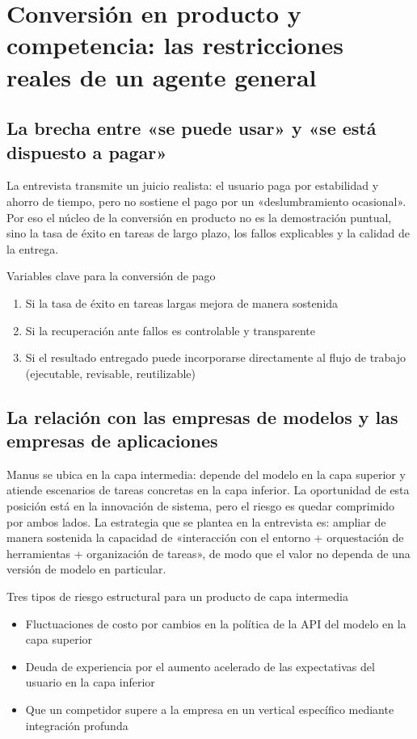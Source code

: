 \section{Conversión en producto y competencia: las restricciones reales de un agente general}

\subsection{La brecha entre «se puede usar» y «se está dispuesto a pagar»}

La entrevista transmite un juicio realista: el usuario paga por estabilidad y ahorro de tiempo, pero no sostiene el pago por un «deslumbramiento ocasional». Por eso el núcleo de la conversión en producto no es la demostración puntual, sino la tasa de éxito en tareas de largo plazo, los fallos explicables y la calidad de la entrega.

\begin{importantbox}{Variables clave para la conversión de pago}
\begin{enumerate}
    \item Si la tasa de éxito en tareas largas mejora de manera sostenida
    \item Si la recuperación ante fallos es controlable y transparente
    \item Si el resultado entregado puede incorporarse directamente al flujo de trabajo (ejecutable, revisable, reutilizable)
\end{enumerate}
\end{importantbox}

\subsection{La relación con las empresas de modelos y las empresas de aplicaciones}

Manus se ubica en la capa intermedia: depende del modelo en la capa superior y atiende escenarios de tareas concretas en la capa inferior. La oportunidad de esta posición está en la innovación de sistema, pero el riesgo es quedar comprimido por ambos lados. La estrategia que se plantea en la entrevista es: ampliar de manera sostenida la capacidad de «interacción con el entorno + orquestación de herramientas + organización de tareas», de modo que el valor no dependa de una versión de modelo en particular.

\begin{warningbox}{Tres tipos de riesgo estructural para un producto de capa intermedia}
\begin{itemize}
    \item Fluctuaciones de costo por cambios en la política de la API del modelo en la capa superior
    \item Deuda de experiencia por el aumento acelerado de las expectativas del usuario en la capa inferior
    \item Que un competidor supere a la empresa en un vertical específico mediante integración profunda
\end{itemize}
\end{warningbox}

